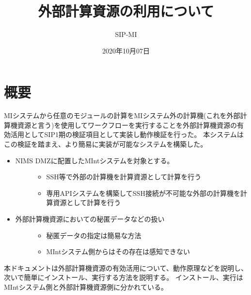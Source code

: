 \documentclass[letterpaper,10pt,dvipdfmx,openany]{sphinxmanual}
\title{外部計算資源の利用について}
\date{2020年10月07日}
\author{SIP-MI}
\begin{document}
\pagestyle{empty}
\sphinxmaketitle
\pagestyle{plain}
\sphinxtableofcontents
\pagestyle{normal}
\label{\detokenize{index::doc}}



\chapter{概要}
\label{\detokenize{using_distributed_properties:id1}}\label{\detokenize{using_distributed_properties::doc}}
MIシステムから任意のモジュールの計算をMIシステム外の計算機(これを外部計算機資源と言う)を使用してワークフローを実行することを外部計算機資源の有効活用としてSIP1期の検証項目として実装し動作検証を行った。
本システムはこの検証を踏まえ、より簡易に実装が可能なシステムを構築した。
\begin{itemize}
\item {} \begin{description}
\item[{NIMS DMZに配置したMIntシステムを対象とする。}] \leavevmode\begin{itemize}
\item {} 
SSH等で外部の計算機を計算資源として計算を行う

\item {} 
専用APIシステムを構築してSSH接続が不可能な外部の計算機を計算資源として計算を行う

\end{itemize}

\end{description}

\item {} \begin{description}
\item[{外部計算機資源においての秘匿データなどの扱い}] \leavevmode\begin{itemize}
\item {} 
秘匿データの指定は簡易な方法

\item {} 
MIntシステム側からはその存在は感知できない

\end{itemize}

\end{description}

\end{itemize}

本ドキュメントは外部計算機資源の有効活用について、動作原理などを説明し、次いで簡単にインストール、実行する方法を説明する。
インストール、実行はMIntシステム側と外部計算機資源側に分かれている。
\end{document}
